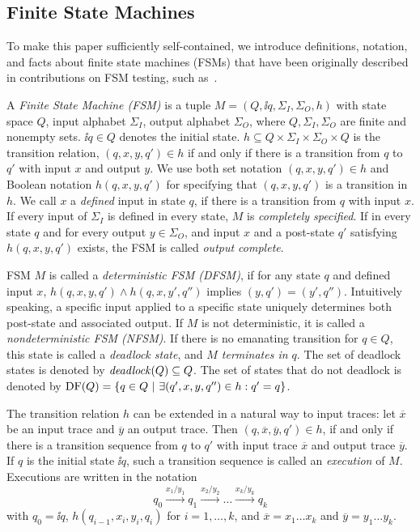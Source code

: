\subsection{Finite State Machines}


To make this paper sufficiently self-contained, we introduce definitions, notation, and facts
about
finite state machines (FSMs) that have been originally described in contributions on FSM testing, such as~\cite{petrenko_testing_2011,DBLP:conf/hase/PetrenkoY14,hierons_testing_2004}.

A \emph{Finite State Machine (FSM)} is  a tuple
 $M=(Q, \ii{q}, \Sigma_I, \Sigma_O,  h)$   with state space $Q$, input alphabet $\Sigma_I$,
 output alphabet $\Sigma_O$, where $Q,\Sigma_I,\Sigma_O$ are finite and nonempty sets. $\ii{q}\in Q$ denotes the initial state.
$h\subseteq Q\times \Sigma_I \times \Sigma_O\times Q$ is the  transition relation,  $(q,x,y,q')\in h$ if and only if there is a transition from $q$ to $q'$ with input $x$ and output $y$.
We use  both set notation $(q,x,y,q')\in h$ and Boolean notation $h(q,x,y,q')$ for specifying
that $(q,x,y,q')$ is a transition in $h$.
We call $x$ a \emph{defined} input in state $q$, if there is a transition from $q$  with input $x$.
If every input of $\Sigma_I$ is defined in every state, $M$ is \emph{completely specified}.
If in every state $q$ and for every output $y\in\Sigma_O$, and input $x$ and a post-state
$q'$ satisfying $h(q,x,y,q')$ exists, the FSM is called \emph{output complete}.


FSM $M$ is called a \emph{deterministic FSM (DFSM)}, if for any state $q$ and defined input $x$,
$h(q,x,y,q') \wedge h(q,x,y',q'')$ implies $(y,q') = (y',q'')$. Intuitively speaking, a specific
input applied to a specific state uniquely determines both post-state and associated output.
If $M$ is not deterministic, it is called a \emph{nondeterministic FSM (NFSM)}.
If there is no emanating transition for $q\in Q$, this state is called a \emph{deadlock state}, and
\emph{$M$ terminates in $q$}. The set of deadlock states is denoted by ${\it deadlock}(Q)\subseteq Q$.
The set of states that do not deadlock is denoted by
$\text{DF}(Q) = \{ q\in Q~|~\exists (q',x,y,q'')\in h: q' = q \}$.


The transition relation $h$ can be extended in a natural way to input traces:
let $\overline{x}$ be an input trace and $\overline{y}$ an output trace. Then
$(q,\overline{x},\overline{y},q')\in h$, if and only if there is a transition sequence
from $q$ to $q'$ with input trace $\overline{x}$ and output trace $\overline{y}$.
If $q$ is the initial state $\ii{q}$, such a transition sequence is called an \emph{execution} of $M$. Executions are written in the notation
$$
q_0 \xrightarrow{x_1/y_1} q_1 \xrightarrow{x_2/y_2} \dots \xrightarrow{x_{k}/y_{k}} q_{k}
$$
with $q_0 = \ii{q}$, $h(q_{i-1},x_i,y_i,q_{i})$ for $i = 1,\dots,k$, and
$\overline{x} = x_1\dots x_k$ and $\overline{y} = y_1\dots y_k$.

